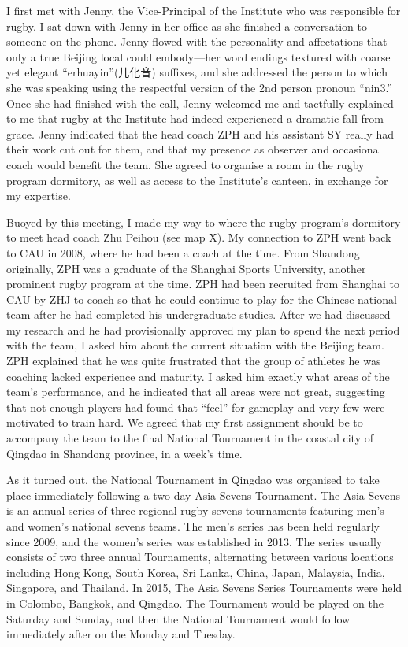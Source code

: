   I first met with Jenny, the Vice-Principal of the Institute who was responsible for rugby.  I sat down with Jenny in her office as she finished a conversation to someone on the phone. Jenny flowed with the personality and affectations that only a true Beijing local could embody---her word endings textured with coarse yet elegant ``erhuayin''(儿化音) suffixes, and she addressed the person to which she was speaking using the respectful version of the 2nd person pronoun ``nin3.''  Once she had finished with the call, Jenny welcomed me and tactfully explained to me that rugby at the Institute had indeed experienced a dramatic fall from grace.  Jenny indicated that the head coach ZPH and his assistant SY really had their work cut out for them, and that my presence as observer and occasional coach would benefit the team.  She agreed to organise a room in the rugby program dormitory, as well as access to the Institute's canteen, in exchange for my expertise.

  Buoyed by this meeting, I made my way to where the rugby program's dormitory to meet head coach Zhu Peihou (see map X).  My connection to ZPH went back to CAU in 2008, where he had been a coach at the time. From Shandong originally, ZPH was a graduate of the Shanghai Sports University, another prominent rugby program at the time.  ZPH had been recruited from Shanghai to CAU by ZHJ to coach so that he could continue to play for the Chinese national team after he had completed his undergraduate studies.  After we had discussed my research and he had provisionally approved my plan to spend the next period with the team, I asked him about the current situation with the Beijing team.  ZPH explained that he was quite frustrated that the group of athletes he was coaching lacked experience and maturity. I asked him exactly what areas of the team's performance, and he indicated that all areas were not great, suggesting that not enough players had found that ``feel'' for gameplay and very few were motivated to train hard.  We agreed that my first assignment should be to accompany the team to the final National Tournament in the coastal city of Qingdao in Shandong province, in a week's time.

  As it turned out, the National Tournament in Qingdao was organised to take place immediately following a two-day Asia Sevens Tournament.  The Asia Sevens is an annual series of three regional rugby sevens tournaments featuring men's and women's national sevens teams.  The men's series has been held regularly since 2009, and the women's series was established in 2013. The series usually consists of two three annual Tournaments, alternating between various locations including Hong Kong, South Korea, Sri Lanka, China, Japan, Malaysia, India, Singapore, and Thailand.  In 2015, The Asia Sevens Series Tournaments were held in Colombo, Bangkok, and Qingdao. The Tournament would be played on the Saturday and Sunday, and then the National Tournament would follow immediately after on the Monday and Tuesday.

